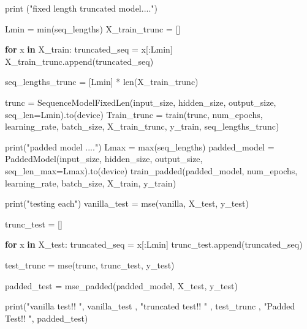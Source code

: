 \documentclass[
  letterpaper,
  DIV=11,
  numbers=noendperiod]{scrartcl}
\newenvironment{Shaded}{\begin{snugshade}}{\end{snugshade}}
\newcommand{\BuiltInTok}[1]{\textcolor[rgb]{0.00,0.23,0.31}{#1}}
\newcommand{\ControlFlowTok}[1]{\textcolor[rgb]{0.00,0.23,0.31}{\textbf{#1}}}
\newcommand{\KeywordTok}[1]{\textcolor[rgb]{0.00,0.23,0.31}{\textbf{#1}}}
\newcommand{\NormalTok}[1]{\textcolor[rgb]{0.00,0.23,0.31}{#1}}
\newcommand{\OperatorTok}[1]{\textcolor[rgb]{0.37,0.37,0.37}{#1}}
\newcommand{\StringTok}[1]{\textcolor[rgb]{0.13,0.47,0.30}{#1}}
\begin{document}
\begin{Shaded}
\begin{Highlighting}[]
    \BuiltInTok{print}\NormalTok{ (}\StringTok{"fixed length truncated model...."}\NormalTok{)}


\NormalTok{    Lmin }\OperatorTok{=} \BuiltInTok{min}\NormalTok{(seq\_lengths)}
\NormalTok{    X\_train\_trunc }\OperatorTok{=}\NormalTok{ []}

    \ControlFlowTok{for}\NormalTok{ x }\KeywordTok{in}\NormalTok{ X\_train:}
\NormalTok{         truncated\_seq }\OperatorTok{=}\NormalTok{ x[:Lmin]}
\NormalTok{         X\_train\_trunc.append(truncated\_seq)}

\NormalTok{    seq\_lengths\_trunc }\OperatorTok{=}\NormalTok{ [Lmin] }\OperatorTok{*} \BuiltInTok{len}\NormalTok{(X\_train\_trunc)}


\NormalTok{    trunc }\OperatorTok{=}\NormalTok{ SequenceModelFixedLen(input\_size, hidden\_size, output\_size, seq\_len}\OperatorTok{=}\NormalTok{Lmin).to(device)}
\NormalTok{    Train\_trunc }\OperatorTok{=}\NormalTok{ train(trunc, num\_epochs, learning\_rate, batch\_size, X\_train\_trunc, y\_train, seq\_lengths\_trunc)}



    \BuiltInTok{print}\NormalTok{(}\StringTok{"padded model ...."}\NormalTok{)}
\NormalTok{    Lmax }\OperatorTok{=} \BuiltInTok{max}\NormalTok{(seq\_lengths)}
\NormalTok{    padded\_model }\OperatorTok{=}\NormalTok{ PaddedModel(input\_size, hidden\_size, output\_size, seq\_len\_max}\OperatorTok{=}\NormalTok{Lmax).to(device)}
\NormalTok{    train\_padded(padded\_model, num\_epochs, learning\_rate, batch\_size, X\_train, y\_train)}


    \BuiltInTok{print}\NormalTok{(}\StringTok{"testing each"}\NormalTok{)}
\NormalTok{    vanilla\_test }\OperatorTok{=}\NormalTok{ mse(vanilla, X\_test, y\_test)}

\NormalTok{    trunc\_test }\OperatorTok{=}\NormalTok{ []}

    \ControlFlowTok{for}\NormalTok{ x }\KeywordTok{in}\NormalTok{ X\_test:}
\NormalTok{        truncated\_seq }\OperatorTok{=}\NormalTok{ x[:Lmin]}
\NormalTok{        trunc\_test.append(truncated\_seq)}

\NormalTok{    test\_trunc   }\OperatorTok{=}\NormalTok{ mse(trunc, trunc\_test, y\_test)}

\NormalTok{    padded\_test  }\OperatorTok{=}\NormalTok{ mse\_padded(padded\_model, X\_test, y\_test)}

    \BuiltInTok{print}\NormalTok{(}\StringTok{"vanilla test!!  "}\NormalTok{, vanilla\_test , }\StringTok{"truncated test!! "}\NormalTok{ , test\_trunc , }\StringTok{"Padded Test!! "}\NormalTok{, padded\_test)}


\end{Highlighting}
\end{Shaded}
\end{document}
